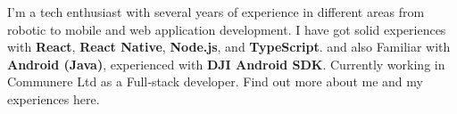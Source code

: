 \begin{cvparagraph}
I’m a tech enthusiast with several years of experience in different areas from robotic to mobile and web application development. I have got solid experiences with \textbf{React}, \textbf{React Native}, \textbf{Node.js}, and \textbf{TypeScript}. and also Familiar with \textbf{Android (Java)}, experienced with \textbf{DJI Android SDK}.\break
Currently working in Communere Ltd as a Full‑stack developer. Find out more about me and my experiences here.
\end{cvparagraph}
